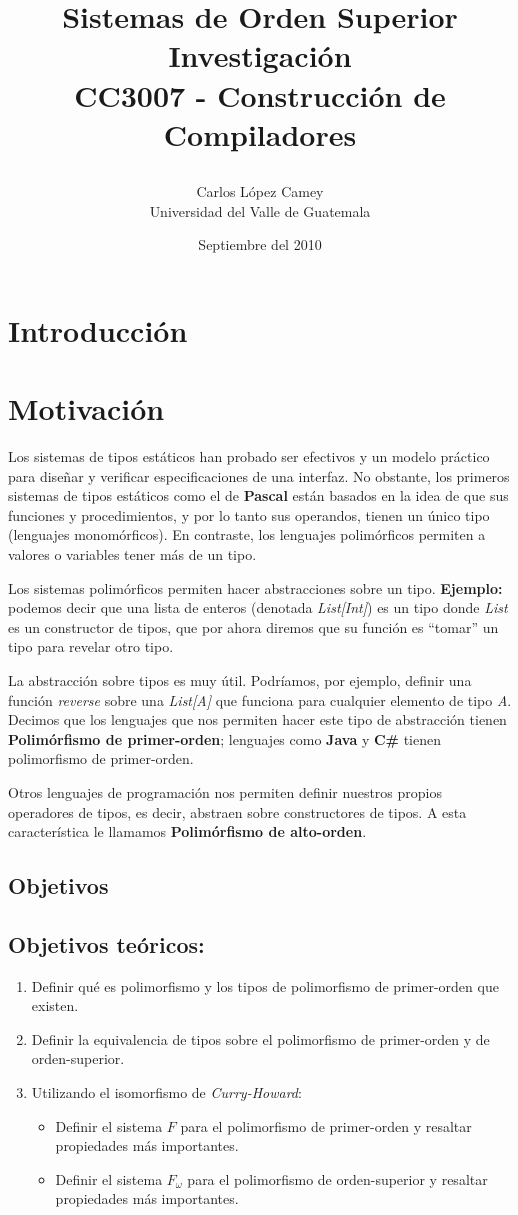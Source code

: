 \documentclass[spanish]{article}
\title{
  Sistemas de Orden Superior \\
  Investigación \\
  CC3007 - Construcción de Compiladores
  \author{Carlos López Camey \\
  Universidad del Valle de Guatemala}
}
\date{Septiembre del 2010}
\begin{document}
\section{Introducción}

\section{Motivación}

Los sistemas de tipos estáticos han probado ser efectivos y un modelo práctico para diseñar y verificar especificaciones de una interfaz. No obstante, los primeros sistemas de tipos estáticos como el de \textbf{Pascal} están basados en la idea de que sus funciones y procedimientos, y por lo tanto sus operandos, tienen un único tipo (lenguajes monomórficos). En contraste, los lenguajes polimórficos permiten a valores o variables tener más de un tipo. 

Los sistemas polimórficos permiten hacer abstracciones sobre un tipo. \textbf{Ejemplo:} podemos decir que una lista de enteros (denotada \textit{List[Int]}) es un tipo donde \textit{List} es un constructor de tipos, que por ahora diremos que su función es ``tomar'' un tipo para revelar otro tipo.  

La abstracción sobre tipos es muy útil. Podríamos, por ejemplo, definir una función \textit{reverse} sobre una \textit{List[A]} que funciona para cualquier elemento de tipo \textit{A}. Decimos que los lenguajes que nos permiten hacer este tipo de abstracción tienen \textbf{Polimórfismo de primer-orden}; lenguajes como \textbf{Java} y \textbf{C\#} tienen polimorfismo de primer-orden.

Otros lenguajes de programación nos permiten definir nuestros propios operadores de tipos, es decir, abstraen sobre constructores de tipos. A esta característica le llamamos \textbf{Polimórfismo de alto-orden}.

\subsection{Objetivos}

\subsection{Objetivos teóricos:}
\begin{enumerate}
\item Definir qué es polimorfismo y los tipos de polimorfismo de primer-orden que existen.
\item Definir la equivalencia de tipos sobre el polimorfismo de primer-orden y de orden-superior.
\item Utilizando el isomorfismo de \textit{Curry-Howard}:
  \begin{itemize}
  \item Definir el sistema $F$ para el polimorfismo de primer-orden y resaltar propiedades más importantes.
  \item Definir el sistema $F_\omega$ para el polimorfismo de orden-superior y resaltar propiedades más importantes.
  \end{itemize}
\end{enumerate}
\pagebreak
\end{document}

